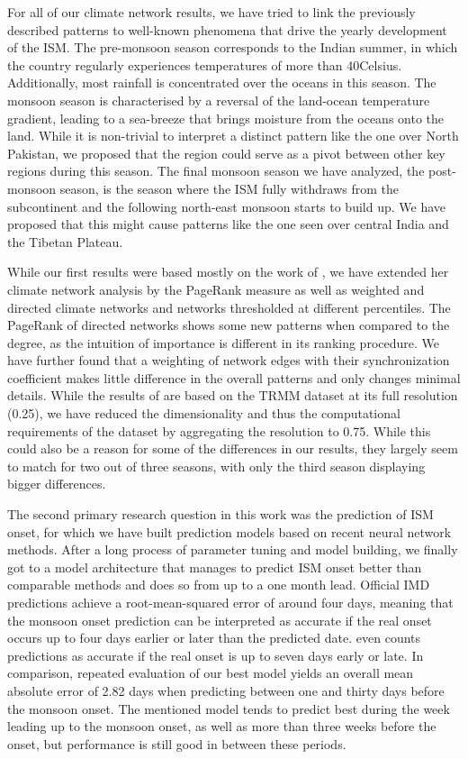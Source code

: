For all of our climate network results, we have tried to link the previously described patterns to well-known phenomena that drive the yearly development of the ISM. The pre-monsoon season corresponds to the Indian summer, in which the country regularly experiences temperatures of more than 40\degree Celsius. Additionally, most rainfall is concentrated over the oceans in this season. The monsoon season is characterised by a reversal of the land-ocean temperature gradient, leading to a sea-breeze that brings moisture from the oceans onto the land. While it is non-trivial to interpret a distinct pattern like the one over North Pakistan, we proposed that the region could serve as a pivot between other key regions during this season. The final monsoon season we have analyzed, the post-monsoon season, is the season where the ISM fully withdraws from the subcontinent and the following north-east monsoon starts to build up. We have proposed that this might cause patterns like the one seen over central India and the Tibetan Plateau.

While our first results were based mostly on the work of \citet{Stolbova.2015}, we have extended her climate network analysis by the PageRank measure as well as weighted and directed climate networks and networks thresholded at different percentiles. The PageRank of directed networks shows some new patterns when compared to the degree, as the intuition of importance is different in its ranking procedure. We have further found that a weighting of network edges with their synchronization coefficient makes little difference in the overall patterns and only changes minimal details. While the results of \citet{Stolbova.2015} are based on the TRMM dataset at its full resolution (0.25\degree), we have reduced the dimensionality and thus the computational requirements of the dataset by aggregating the resolution to 0.75\degree. While this could also be a reason for some of the differences in our results, they largely seem to match for two out of three seasons, with only the third season displaying bigger differences.

The second primary research question in this work was the prediction of ISM onset, for which we have built prediction models based on recent neural network methods. After a long process of parameter tuning and model building, we finally got to a model architecture that manages to predict ISM onset better than comparable methods and does so from up to a one month lead. Official IMD predictions achieve a root-mean-squared error of around four days, meaning that the monsoon onset prediction can be interpreted as accurate if the real onset occurs up to four days earlier or later than the predicted date. \citet{Stolbova.2015} even counts predictions as accurate if the real onset is up to seven days early or late. In comparison, repeated evaluation of our best model yields an overall mean absolute error of 2.82 days when predicting between one and thirty days before the monsoon onset. The mentioned model tends to predict best during the week leading up to the monsoon onset, as well as more than three weeks before the onset, but performance is still good in between these periods.

